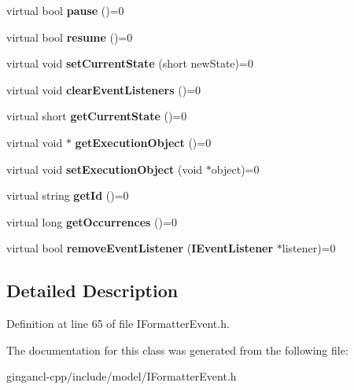 \begin{CompactItemize}
\item 
virtual bool \textbf{pause} ()=0\label{classbr_1_1pucrio_1_1telemidia_1_1ginga_1_1ncl_1_1model_1_1event_1_1IFormatterEvent_a544dca6a4e7bcd86379018920bb11f4}

\item 
virtual bool \textbf{resume} ()=0\label{classbr_1_1pucrio_1_1telemidia_1_1ginga_1_1ncl_1_1model_1_1event_1_1IFormatterEvent_701a82910f1a64d414be9950ff558539}

\item 
virtual void \textbf{setCurrentState} (short newState)=0\label{classbr_1_1pucrio_1_1telemidia_1_1ginga_1_1ncl_1_1model_1_1event_1_1IFormatterEvent_daa14b6043a5b362405852f028162cd5}

\item 
virtual void \textbf{clearEventListeners} ()=0\label{classbr_1_1pucrio_1_1telemidia_1_1ginga_1_1ncl_1_1model_1_1event_1_1IFormatterEvent_4b596bb50c61b14a4b9c538d612b3f2b}

\item 
virtual short \textbf{getCurrentState} ()=0\label{classbr_1_1pucrio_1_1telemidia_1_1ginga_1_1ncl_1_1model_1_1event_1_1IFormatterEvent_35b48e1b242182de8ae5a13419514bfe}

\item 
virtual void $\ast$ \textbf{getExecutionObject} ()=0\label{classbr_1_1pucrio_1_1telemidia_1_1ginga_1_1ncl_1_1model_1_1event_1_1IFormatterEvent_cc5f9baf0e4b5dec4fb704a65a324c88}

\item 
virtual void \textbf{setExecutionObject} (void $\ast$object)=0\label{classbr_1_1pucrio_1_1telemidia_1_1ginga_1_1ncl_1_1model_1_1event_1_1IFormatterEvent_eb032a8d227a6fde19bc05d039befde0}

\item 
virtual string \textbf{getId} ()=0\label{classbr_1_1pucrio_1_1telemidia_1_1ginga_1_1ncl_1_1model_1_1event_1_1IFormatterEvent_39b7e38150f5b594312f13331b802342}

\item 
virtual long \textbf{getOccurrences} ()=0\label{classbr_1_1pucrio_1_1telemidia_1_1ginga_1_1ncl_1_1model_1_1event_1_1IFormatterEvent_4ecbd792bba23877aa3403862251d99d}

\item 
virtual bool \textbf{removeEventListener} ({\bf IEventListener} $\ast$listener)=0\label{classbr_1_1pucrio_1_1telemidia_1_1ginga_1_1ncl_1_1model_1_1event_1_1IFormatterEvent_c97982703beda74066d0332dd1f00db0}

\end{CompactItemize}


\subsection{Detailed Description}




Definition at line 65 of file IFormatterEvent.h.

The documentation for this class was generated from the following file:\begin{CompactItemize}
\item 
gingancl-cpp/include/model/IFormatterEvent.h\end{CompactItemize}
